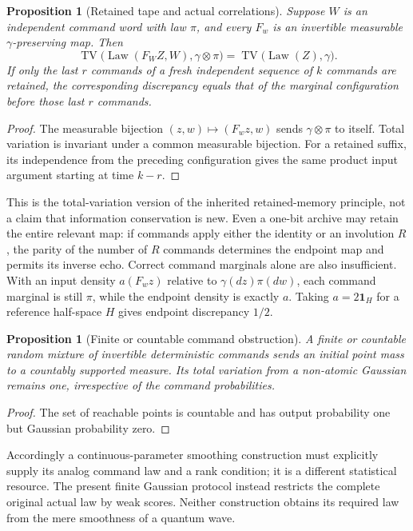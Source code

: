 \documentclass[11pt]{article}
\numberwithin{equation}{section}
\newtheorem{proposition}[theorem]{Proposition}
\theoremstyle{definition}
\theoremstyle{remark}
\newcommand{\TV}{\operatorname{TV}}
\begin{document}
\begin{proposition}[Retained tape and actual correlations]\label{prop:tape}
Suppose $W$ is an independent command word with law $\pi$, and every $F_w$ is an invertible measurable $\gamma$-preserving map. Then
\[
 \TV\bigl(\operatorname{Law}(F_WZ,W),\gamma\otimes\pi\bigr)
 =\TV\bigl(\operatorname{Law}(Z),\gamma\bigr).
\]
If only the last $r$ commands of a fresh independent sequence of $k$ commands are retained, the corresponding discrepancy equals that of the marginal configuration before those last $r$ commands.
\end{proposition}
\begin{proof}
The measurable bijection $(z,w)\mapsto(F_wz,w)$ sends $\gamma\otimes\pi$ to itself. Total variation is invariant under a common measurable bijection. For a retained suffix, its independence from the preceding configuration gives the same product input argument starting at time $k-r$.
\end{proof}
This is the total-variation version of the inherited retained-memory principle, not a claim that information conservation is new. Even a one-bit archive may retain the entire relevant map: if commands apply either the identity or an involution $R$, the parity of the number of $R$ commands determines the endpoint map and permits its inverse echo. Correct command marginals alone are also insufficient. With an input density $a(F_wz)$ relative to $\gamma(dz)\pi(dw)$, each command marginal is still $\pi$, while the endpoint density is exactly $a$. Taking $a=2\mathbf1_H$ for a reference half-space $H$ gives endpoint discrepancy $1/2$.

\begin{proposition}[Finite or countable command obstruction]\label{prop:atomic}
A finite or countable random mixture of invertible deterministic commands sends an initial point mass to a countably supported measure. Its total variation from a non-atomic Gaussian remains one, irrespective of the command probabilities.
\end{proposition}
\begin{proof}
The set of reachable points is countable and has output probability one but Gaussian probability zero.
\end{proof}
Accordingly a continuous-parameter smoothing construction must explicitly supply its analog command law and a rank condition; it is a different statistical resource. The present finite Gaussian protocol instead restricts the complete original actual law by weak scores. Neither construction obtains its required law from the mere smoothness of a quantum wave.
\end{document}
